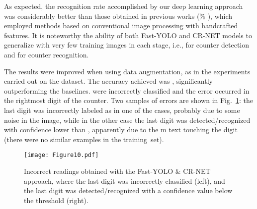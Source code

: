 As expected, the recognition rate accomplished by our deep learning approach
was considerably better than those obtained in previous works (\% ), which employed methods based on conventional image processing with handcrafted features. It is noteworthy the ability of both Fast-YOLO and CR-NET models to generalize with very few training images in each stage, i.e.,  for counter detection and  for counter recognition. 
 
The results were improved when using data augmentation, as in the experiments carried out on the \dataset dataset.
The accuracy achieved was \REV{\%}, significantly outperforming the baselines.
 were incorrectly classified and  the error occurred in the rightmost digit of the counter. 
Two samples of errors are shown in Fig.~\ref{fig:result_meter_integration}: the last digit  was incorrectly labeled as  in one of the cases, probably due to some noise in the image, while in the other case the last digit was detected/recognized with confidence lower than , apparently due to the m text touching the digit (there were no similar examples in the training~set). 

\begin{figure}[!htb]
	\begin{center}
	\texttt{[image: Figure10.pdf]}
    \end{center}
    \vspace{-1mm}
    \caption{Incorrect readings obtained with the Fast-YOLO \& CR-NET approach, where the last digit was incorrectly classified (left), and the last digit was detected/recognized with a confidence value below the threshold (right).}
	\label{fig:result_meter_integration}  
\end{figure}